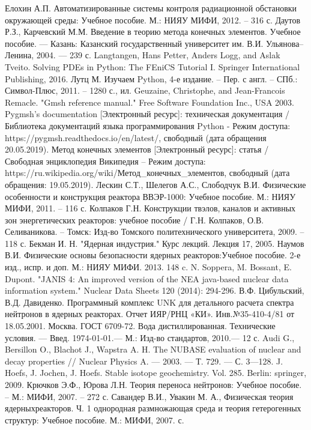 \begin{thebibliography}{99}
	 Елохин А.П. Автоматизированные системы контроля радиационной обстановки окружающей среды: 
		Учебное пособие. М.: НИЯУ МИФИ, 2012. – 316 с.
	 Даутов Р.З., Карчевский М.М. Введение в теорию метода конечных элементов. Учебное пособие. — Казань: 
		Казанский государственный университет им. В.И. Ульянова–Ленина, 2004. — 239 с.
	 Langtangen, Hans Petter, Anders Logg, and Aslak Tveito. Solving PDEs in Python: The FEniCS 
		Tutorial I. Springer International Publishing, 2016.
	 Лутц М. Изучаем Python, 4-е издание. – Пер. с англ. – СПб.: Символ-Плюс, 2011. – 1280 с., ил.
	 Geuzaine, Christophe, and Jean-Francois Remacle. "Gmsh reference manual." Free Software 
		Foundation Inc., USA 2003.
	 Pygmsh's documentation [Электронный ресурс]: техническая документация / Библиотека документаций 
		языка программирования Python - Режим доступа: https://pygmsh.readthedocs.io/en/latest/, свободный (дата 
		обращения 20.05.2019).
	 Метод конечных элементов [Электронный ресурс]: статья / Свободная энциклопедия Википедия – Режим 
		доступа: https://ru.wikipedia.org/wiki/Метод\_конечных\_элементов, свободный (дата обращения: 19.05.2019).
	 Лескин С.Т., Шелегов А.С., Слободчук В.И. Физические особенности и конструкция реактора 
		ВВЭР-1000: Учебное пособие. М.: НИЯУ МИФИ, 2011. – 116 с.
	 Колпаков Г.Н. Конструкции твэлов, каналов и активных зон энергетических реакторов: учебное 
		пособие / Г.Н. Колпаков, О.В. Селиваникова. – Томск: Изд-во Томского политехнического университета, 2009. 
		– 118 с. 
	 Бекман И. Н. "Ядерная индустрия." Курс лекций. Лекция 17, 2005.
	 Наумов В.И. Физические основы безопасности ядерных реакторов:Учебное пособие. 2-е изд., испр. 
		и доп. М.: НИЯУ МИФИ. 2013. 148 c.
	 N. Soppera, M. Bossant, E. Dupont. "JANIS 4: An improved version of the NEA java-based nuclear data 
		information system." Nuclear Data Sheets 120 (2014): 294-296.
	 В.Ф. Цибульский, В.Д. Давиденко. Программный комплекс UNK для детального расчета спектра нейтронов в 
		ядерных реакторах. Отчет ИЯР/РНЦ «КИ». Инв.№35-410-4/81 от 18.05.2001. Москва.
	 ГОСТ 6709-72. Вода дистиллированная. Технические условия. — Введ. 1974-01-01.— М.: Изд-во 
		стандартов, 2010.— 12 с.
	 Audi G., Bersillon O., Blachot J., Wapstra A. H. The NUBASE evaluation of nuclear and decay properties 
		// Nuclear Physics A. — 2003. — Т. 729. — С. 3—128. 
	 J. Hoefs, J. Jochen, J. Hoefs. Stable isotope geochemistry. Vol. 285. Berlin: springer, 2009.
	 Крючков Э.Ф., Юрова Л.Н. Теория переноса нейтронов: Учебное пособие. – М.: МИФИ, 2007. – 272 с. 
	 Савандер В.И., Увакин М. А., Физическая теория ядерныхреакторов. Ч. 1 однородная размножающая среда 
		и теория гетерогенных структур: Учебное пособие. М.: МИФИ, 2007. с.
\end{thebibliography}